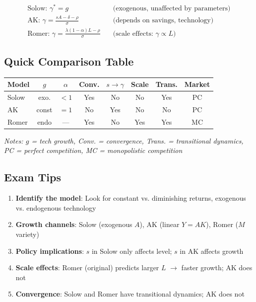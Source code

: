 \begin{tcolorbox}[colback=red!5,colframe=red!60,title=Final Growth Rates]
\begin{align*}
\boxed{\text{Solow: } \gamma^* = g} \quad &\text{(exogenous, unaffected by parameters)} \\[4pt]
\boxed{\text{AK: } \gamma = \frac{sA - \delta - \rho}{\sigma}} \quad &\text{(depends on savings, technology)} \\[4pt]
\boxed{\text{Romer: } \gamma = \frac{\lambda(1-\alpha)L - \rho}{\sigma}} \quad &\text{(scale effects: } \gamma \propto L\text{)}
\end{align*}
\end{tcolorbox}

\subsection*{Quick Comparison Table}

\begin{center}
\begin{tabular}{lccccccc}
\toprule
\textbf{Model} & $g$ & $\alpha$ & Conv. & $s \to \gamma$ & Scale & Trans. & Market \\
\midrule
Solow & exo. & $<1$ & Yes & No & No & Yes & PC \\
AK & const & $=1$ & No & Yes & No & No & PC \\
Romer & endo & — & Yes & No & Yes & Yes & MC \\
\bottomrule
\end{tabular}
\end{center}

\medskip
\noindent \textit{Notes: $g$ = tech growth, Conv. = convergence, Trans. = transitional dynamics, PC = perfect competition, MC = monopolistic competition}

\subsection*{Exam Tips}

\begin{enumerate}
    \item \textbf{Identify the model}: Look for constant vs. diminishing returns, exogenous vs. endogenous technology
    \item \textbf{Growth channels}: Solow (exogenous $A$), AK (linear $Y=AK$), Romer ($M$ variety)
    \item \textbf{Policy implications}: $s$ in Solow only affects level; $s$ in AK affects growth
    \item \textbf{Scale effects}: Romer (original) predicts larger $L$ $\to$ faster growth; AK does not
    \item \textbf{Convergence}: Solow and Romer have transitional dynamics; AK does not
\end{enumerate}
